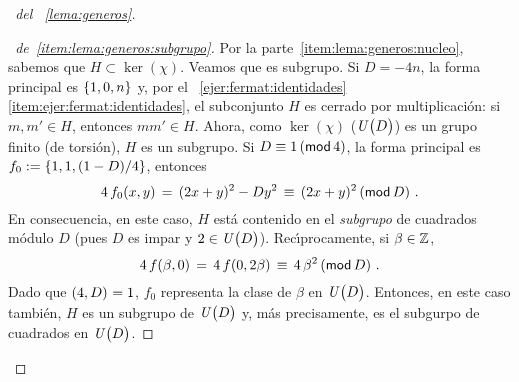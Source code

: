 \begin{proof}[\proofname~del \lemaname~\ref{lema:generos}]
	\begin{proof}[\proofname~de~\ref{item:lema:generos:subgrupo}]
		Por la parte~\ref{item:lema:generos:nucleo}, sabemos que
		$H\subset\ker(\chi)$. Veamos que es subgrupo. Si $D=-4n$,
		la forma principal es $\binaria{1,0,n}$ y, por el
		\ejername~\ref{ejer:fermat:identidades}~%
		\eqref{item:ejer:fermat:identidades},
		el subconjunto $H$ es cerrado por multiplicaci\'on:
		si $m,m'\in H$, entonces $mm'\in H$. Ahora, como
		$\ker(\chi)$ ($\Unidadesmod[D]$) es un grupo finito
		(de torsi\'on), $H$ es un subgrupo.
		Si $D\equiv 1\tmodulo[4]$, la forma principal es
		$f_0:=\binaria{1,1,(1-D)/4}$, entonces
		\begin{displaymath}
			4\,f_0(x,y)\,=\,(2x+y)^2-Dy^2\,\equiv\,
				(2x+y)^2\tmodulo[D]
			\dispstop
		\end{displaymath}
		En consecuencia, en este caso, $H$ est\'a contenido en
		el \emph{subgrupo} de cuadrados m\'odulo $D$
		(pues $D$ es impar y $2\in\Unidadesmod[D]$).
		Rec\'{\i}procamente, si $\beta\in\Enteros$,
		\begin{displaymath}
			4\,f(\beta,0)\,=\,4\,f(0,2\beta)\,\equiv\,
				4\,\beta^2\tmodulo[D]
			\dispstop
		\end{displaymath}
		Dado que $\mcd{4,D}=1$, $f_0$ representa la clase de
		$\beta$ en $\Unidadesmod[D]$. Entonces, en este caso
		tambi\'en, $H$ es un subgrupo de $\Unidadesmod[D]$ y,
		m\'as precisamente, es el subgurpo de cuadrados
		en $\Unidadesmod[D]$.
	\end{proof}


\end{proof}
